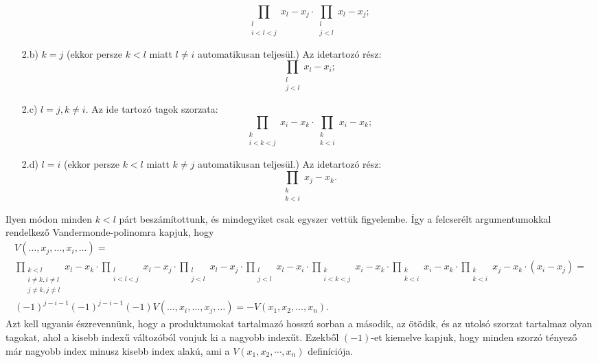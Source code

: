\documentclass[a4paper, showtrims]{memoir}
\makeatletter
\renewenvironment{proof}[1][\proofname]
    {\par\pushQED{\qed}%
    \normalfont \topsep6\p@\@plus6\p@\relax
    \trivlist
    \item[\hskip\labelsep
        \itshape
    #1\@addpunct{:}]\ignorespaces}
    {\popQED\endtrivlist\@endpefalse}
\theoremstyle{plain}
\theoremstyle{remark}
\theoremstyle{definition}
\makeatother
\begin{document}
\begin{proof}
\begin{itemize}
            \[
                \prod_{\substack{l\\i<l<j}}x_l-x_j\cdot\prod_{\substack{l\\j<l}}x_l-x_j;
            \]
        \item[2.b)]
            $k=j$ (ekkor persze $k<l$ miatt $l\neq i$ automatikusan teljesül.)
            Az idetartozó rész:
            \[
                \prod_{\substack{l\\j<l}}x_l-x_i;
            \]
        \item[2.c)]
            $l=j, k\neq i$. Az ide tartozó tagok szorzata:
            \[
                \prod_{\substack{k\\i<k<j}}x_i-x_k\cdot\prod_{\substack{k\\k<i}}x_i-x_k;
            \]
        \item[2.d)]
            $l=i$ (ekkor persze $k<l$ miatt $k\neq j$ automatikusan teljesül.)
            Az idetartozó rész:
            \[
                \prod_{\substack{k\\k<i}}x_j-x_k.
            \]
    \end{itemize}
    Ilyen módon minden $k<l$ párt beszámítottunk, és mindegyiket csak egyszer vettük figyelembe.
    Így a felcserélt argumentumokkal rendelkező Vandermonde-polinomra kapjuk, hogy
    \begin{multline*}
        V\left( \ldots,x_j,\ldots,x_i,\ldots \right)=\\
                \prod_{\substack{k<l\\i\neq k,i\neq l\\ j\neq k,j\neq l}}x_l-x_k
                \cdot
                \prod_{\substack{l\\i<l<j}}x_l-x_j\cdot\prod_{\substack{l\\j<l}}x_l-x_j
                \cdot
                \prod_{\substack{l\\j<l}}x_l-x_i
                \cdot
                \prod_{\substack{k\\i<k<j}}x_i-x_k\cdot\prod_{\substack{k\\k<i}}x_i-x_k
                \cdot
                \prod_{\substack{k\\k<i}}x_j-x_k
                \cdot
                \left( x_i-x_j \right)
                =
                \\
                (-1)^{j-i-1}\left( -1 \right)^{j-i-1}\left( -1 \right)V(\ldots,x_i,\ldots,x_j,\ldots)
                =-V(x_1,x_2,\ldots,x_n).
    \end{multline*}
    Azt kell ugyanis észrevennünk, hogy a produktumokat tartalmazó hosszú sorban a második, az ötödik, és az utolsó szorzat tartalmaz olyan tagokat, ahol a kisebb indexű változóból vonjuk ki a nagyobb indexűt.
    Ezekből $(-1)$-et kiemelve kapjuk, hogy minden szorzó tényező már nagyobb index minusz kisebb index alakú,
    ami a $V\left( x_1,x_2,\cdots,x_n \right)$ definíciója.
\end{proof}
\end{document}
